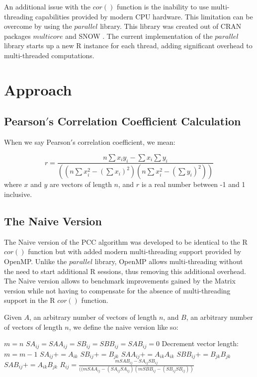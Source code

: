 \documentclass{bioinfo}
\begin{document}
An additional issue with the $cor()$ function is the inability to use 
multi-threading capabilities provided by modern CPU hardware. This limitation 
can be overcome by using the $parallel$ library. This library was created 
out of CRAN packages $multicore$ \citep{Urbanek2009} and SNOW \citep{Tierney2003}. 
The current implementation of the $parallel$ library starts up a new R instance 
for each thread, adding significant overhead to multi-threaded computations.

\vspace*{-6pt}

\section{Approach}
\subsection{Pearson$'$s Correlation Coefficient Calculation}
When we say Pearson$'$s correlation coefficient, we mean:

\begin{equation}
r=\frac{n\sum x_iy_i-\sum x_i\sum y_i}{((n\sum x_i^2-(\sum x_i)^2)(n\sum x_i^2-(\sum y_i)^2))}
\end{equation}
where $x$ and $y$ are vectors of length $n$, and $r$ is a real number between -1 and 1 inclusive.

\subsection{The Naive Version}
The Naive version of the PCC algorithm was developed to be identical 
to the R $cor()$ function but with added modern multi-threading 
support provided by OpenMP. Unlike the $parallel$ library, OpenMP 
allows multi-threading without the need to start additional R 
sessions, thus removing this additional overhead. The Naive version 
allows to benchmark improvements gained by the Matrix version while 
not having to compensate for the absence of multi-threading 
support in the R $cor()$ function.

Given $A$, an arbitrary number of vectors of length $n$, and $B$, an arbitrary number of vectors of length $n$, 
we define the naive version like so:

\vspace{2mm}

\begin{algorithmic}[1]
    \STATE $m=n$
    \STATE $SA_{ij}=SAA_{ij}=SB_{ij}=SBB_{ij}=SAB_{ij}=0$
        \STATE Decrement vector length: $m=m-1$
      \ELSE
        \STATE $SA_{ij}+=A_{ik}$
        \STATE $SB_{ij}+=B_{jk}$
        \STATE $SAA_{ij}+=A_{ik}A_{ik}$
        \STATE $SBB_{ij}+=B_{jk}B_{jk}$
        \STATE $SAB_{ij}+=A_{ik}B_{jk}$
      \ENDIF
    \ENDFOR 
    \STATE $R_{ij}=\frac{mSAB_{ij}-SA_{ij}SB_{ij}}{((mSAA_{ij}-(SA_{ij}SA_{ij})(mSBB_{ij}-(SB_{ij}SB_{ij}))}$
  \ENDFOR
\ENDFOR
\end{algorithmic}
\end{document}
